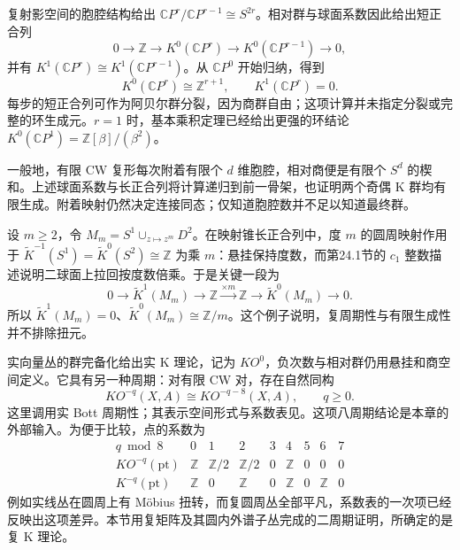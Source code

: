 \begin{example}\label{g2:exm:k-projective-additive}
	复射影空间的胞腔结构给出 \(\mathbb CP^r/\mathbb CP^{r-1}\cong S^{2r}\)。相对群与球面系数因此给出短正合列
	\[
		0\longrightarrow\mathbb Z\longrightarrow K^0(\mathbb CP^r)
		\longrightarrow K^0(\mathbb CP^{r-1})\longrightarrow0,
	\]
	并有 \(K^1(\mathbb CP^r)\cong K^1(\mathbb CP^{r-1})\)。从 \(\mathbb CP^0\) 开始归纳，得到
	\[
		K^0(\mathbb CP^r)\cong\mathbb Z^{r+1},\qquad K^1(\mathbb CP^r)=0.
	\]
	每步的短正合列可作为阿贝尔群分裂，因为商群自由；这项计算并未指定分裂或完整的环生成元。\(r=1\) 时，基本乘积定理已经给出更强的环结论 \(K^0(\mathbb CP^1)=\mathbb Z[\beta]/(\beta^2)\)。
\end{example}

一般地，有限 CW 复形每次附着有限个 \(d\) 维胞腔，相对商便是有限个 \(S^d\) 的楔和。上述球面系数与长正合列将计算递归到前一骨架，也证明两个奇偶 K 群均有限生成。附着映射仍然决定连接同态；仅知道胞腔数并不足以知道最终群。

\begin{example}\label{g2:exm:k-moore-torsion}
	设 \(m\ge2\)，令 \(M_m=S^1\cup_{z\mapsto z^m}D^2\)。在映射锥长正合列中，度 \(m\) 的圆周映射作用于 \(\widetilde K^{-1}(S^1)=\widetilde K^0(S^2)\cong\mathbb Z\) 为乘 \(m\)：悬挂保持度数，而第24.1节的 \(c_1\) 整数描述说明二球面上拉回按度数倍乘。于是关键一段为
	\[
		0\longrightarrow\widetilde K^1(M_m)\longrightarrow\mathbb Z
		\xrightarrow{\times m}\mathbb Z
		\longrightarrow\widetilde K^0(M_m)\longrightarrow0.
	\]
	所以 \(\widetilde K^1(M_m)=0\)、\(\widetilde K^0(M_m)\cong\mathbb Z/m\)。这个例子说明，复周期性与有限生成性并不排除扭元。
\end{example}

\ProseParagraphBreak

实向量丛的群完备化给出实 K 理论，记为 \(KO^0\)，负次数与相对群仍用悬挂和商空间定义。它具有另一种周期：对有限 CW 对，存在自然同构
\[
	KO^{-q}(X,A)\cong KO^{-q-8}(X,A),\qquad q\ge0.
\]
这里调用实 Bott 周期性；其表示空间形式与系数表见\cite[第II章第3节；第IV章第3节]{Weibel2013KBook}。这项八周期结论是本章的外部输入。为便于比较，点的系数为
\[
	\begin{array}{c|cccccccc}
		q\bmod8&0&1&2&3&4&5&6&7\\\hline
		KO^{-q}(\mathrm{pt})&\mathbb Z&\mathbb Z/2&\mathbb Z/2&0&\mathbb Z&0&0&0\\
		K^{-q}(\mathrm{pt})&\mathbb Z&0&\mathbb Z&0&\mathbb Z&0&\mathbb Z&0
	\end{array}
\]
例如实线丛在圆周上有 Möbius 扭转，而复圆周丛全部平凡，系数表的一次项已经反映出这项差异。本节用复矩阵及其圆内外谱子丛完成的二周期证明，所确定的是复 K 理论。
